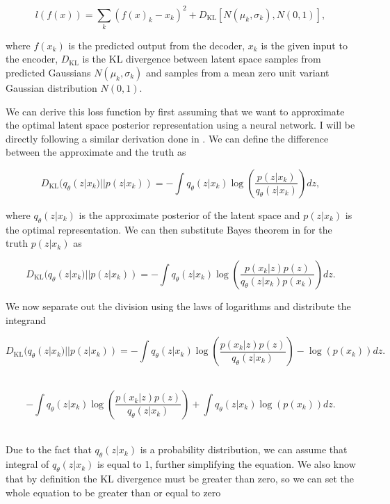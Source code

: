 \begin{equation}
    l(f(x)) = \sum_k{ (f(x)_k - x_k)^2 + 
    D_{\textrm{KL}}[N(\mu_k, \sigma_k), N(0, 1)]},
\end{equation}

where $f(x_k)$ is the predicted output from the decoder, $x_k$
is the given input to the encoder, $D_{\textrm{KL}}$ is the \ac{KL} divergence 
between latent space samples from predicted Gaussians $N(\mu_k, \sigma_k)$ 
and samples from a mean zero unit variant Gaussian 
distribution $N(0,1)$. 

We can derive this loss function by first assuming that we 
want to approximate the optimal latent space posterior 
representation using a neural network. I will be directly following a 
similar derivation done in \cite{1907.08956}. We can define the 
difference between the approximate and the truth as 

\begin{equation}
    D_{\textrm{KL}}(q_{\theta}(z|x_k) || p(z|x_k)) = -\int q_{\theta}(z|x_k) \log(\frac{p(z|x_k)}{q_{\theta}(z|x_k)}) dz,
\end{equation}

where $q_{\theta}(z|x_k)$ is the approximate posterior of the 
latent space and $p(z|x_k)$ is the optimal representation. 
We can then substitute Bayes theorem in for the truth 
$p(z|x_k)$ as 

\begin{equation}
    D_{\textrm{KL}}(q_{\theta}(z|x_k) || p(z|x_k)) = -\int q_{\theta}(z|x_k) 
    \log(\frac{p(x_k|z) p(z)}{q_{\theta}(z|x_k) p(x_k)}) dz. 
\end{equation}

We now separate out the division using the laws of logarithms and 
distribute the integrand

\begin{equation}
    D_{\textrm{KL}}(q_{\theta}(z|x_k) || p(z|x_k)) = -\int q_{\theta}(z|x_k) 
    \log(\frac{p(x_k|z) p(z)}{q_{\theta}(z|x_k)}) - \log(p(x_k)) dz. 
\end{equation}\

\begin{equation}
    -\int q_{\theta}(z|x_k) 
    \log(\frac{p(x_k|z) p(z)}{q_{\theta}(z|x_k)}) +
    \int q_{\theta}(z|x_k) \log(p(x_k)) dz. 
\end{equation}\

Due to the fact that $q_{\theta}(z|x_k)$ is a probability distribution, 
we can assume that integral of $q_{\theta}(z|x_k)$ is equal to 1, 
further simplifying the equation. We also know that by definition the KL 
divergence must be greater than zero, so we can set the whole 
equation to be greater than or equal to zero

